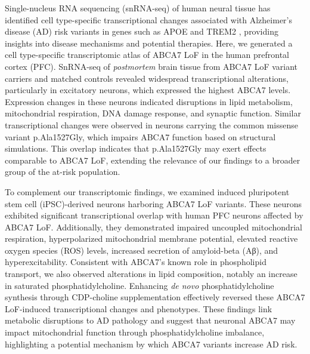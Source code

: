 Single-nucleus RNA sequencing (snRNA-seq) of human neural tissue has identified cell type-specific transcriptional changes associated with Alzheimer's disease (AD) risk variants in genes such as APOE and TREM2 \cite{Brase2023-xk,Blanchard2022-cf,Sayed2021-qn,Wamsley2024-zm,Kamath2022-if}, providing insights into disease mechanisms and potential therapies. Here, we generated a cell type-specific transcriptomic atlas of ABCA7 LoF in the human prefrontal cortex (PFC). SnRNA-seq of \textit{postmortem} brain tissue from ABCA7 LoF variant carriers and matched controls revealed widespread transcriptional alterations, particularly in excitatory neurons, which expressed the highest ABCA7 levels. Expression changes in these neurons indicated disruptions in lipid metabolism, mitochondrial respiration, DNA damage response, and synaptic function. Similar transcriptional changes were observed in neurons carrying the common missense variant p.Ala1527Gly, which impairs ABCA7 function based on structural simulations. This overlap indicates that p.Ala1527Gly may exert effects comparable to ABCA7 LoF, extending the relevance of our findings to a broader group of the at-risk population.

To complement our transcriptomic findings, we examined induced pluripotent stem cell (iPSC)-derived neurons harboring ABCA7 LoF variants. These neurons exhibited significant transcriptional overlap with human PFC neurons affected by ABCA7 LoF. Additionally, they demonstrated impaired uncoupled mitochondrial respiration, hyperpolarized mitochondrial membrane potential, elevated reactive oxygen species (ROS) levels, increased secretion of amyloid-beta (Aβ), and hyperexcitability. Consistent with ABCA7's known role in phospholipid transport, we also observed alterations in lipid composition, notably an increase in saturated phosphatidylcholine. Enhancing \textit{de novo} phosphatidylcholine synthesis through CDP-choline supplementation effectively reversed these ABCA7 LoF-induced transcriptional changes and phenotypes. These findings link metabolic disruptions to AD pathology and suggest that neuronal ABCA7 may impact mitochondrial function through phosphatidylcholine imbalance, highlighting a potential mechanism by which ABCA7 variants increase AD risk.
